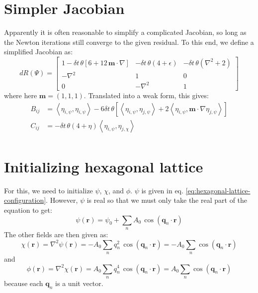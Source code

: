 \documentclass[reqno]{article}
\begin{document}
\section{Simpler Jacobian}
Apparently it is often reasonable to simplify a complicated Jacobian, so long as the Newton iterations still converge to the given residual.
To this end, we define a simplified Jacobian as:
\begin{equation}
    dR(\Psi)
    =
    \begin{bmatrix}
        1 - \delta t \, \theta \left[6 + 12 \, \mathbf{m} \cdot \nabla \right]
        &-\delta t \, \theta \left(4 + \epsilon\right)
        &-\delta t \, \theta \left(\nabla^2 + 2\right) \\
        -\nabla^2 &1 &0 \\
        0 &-\nabla^2 &1
    \end{bmatrix}
\end{equation}
where here $\mathbf{m} = (1, 1, 1)$.
Translated into a weak form, this gives:
\begin{equation}
    \begin{split}
        B_{ij} 
        &= 
        \left<\eta_{i, \psi}, \eta_{i, \psi}\right>
        - 6 \delta t \, \theta \left[
            \left<\eta_{i, \psi}, \eta_{j, \psi}\right>
            + 2 \left<\eta_{i, \psi}, \mathbf{m} \cdot \nabla \eta_{j, \psi}\right>
        \right] \\
        C_{ij}
        &=
        -\delta t \, \theta \left(4 + \eta\right) \left<\eta_{i, \psi}, \eta_{j, \chi}\right> \\
    \end{split}
\end{equation}

\section{Initializing hexagonal lattice}

For this, we need to initialize $\psi$, $\chi$, and $\phi$.
$\psi$ is given in eq. \eqref{eq:hexagonal-lattice-configuration}.
However, $\psi$ is real so that we must only take the real part of the equation to get:
\begin{equation}
    \psi\left(\mathbf{r}\right)
    =
    \psi_0
    + \sum_n A_0 \, \cos \left(\mathbf{q}_n \cdot \mathbf{r} \right)
\end{equation}
The other fields are then given as:
\begin{equation}
    \chi(\mathbf{r})
    =
    \nabla^2 \psi(\mathbf{r})
    =
    - A_0 \sum_n q_n^2 \, \cos \left(\mathbf{q}_n \cdot \mathbf{r} \right)
    = 
    - A_0 \sum_n \cos \left(\mathbf{q}_n \cdot \mathbf{r} \right) 
\end{equation}
and
\begin{equation}
    \phi(\mathbf{r})
    =
    \nabla^2 \chi(\mathbf{r})
    =
    A_0 \sum_n q_n^4 \, \cos \left(\mathbf{q}_n \cdot \mathbf{r} \right) 
    =
    A_0 \sum_n \cos \left(\mathbf{q}_n \cdot \mathbf{r} \right) 
\end{equation}
because each $\mathbf{q}_n$ is a unit vector.
\end{document}
